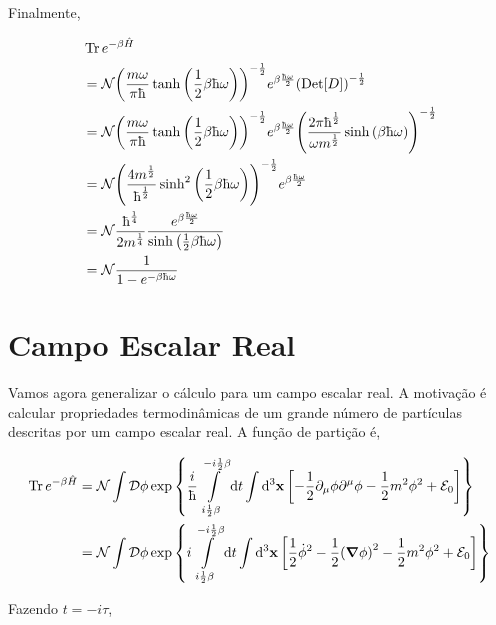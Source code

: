 \documentclass[twoside]{amsart}
\newcommand{\Dd}[1]{\mathcal D #1}
\newcommand{\Det}[1]{\textup{Det} #1}
\numberwithin{equation}{section}
\begin{document}
Finalmente,

\begin{align}
    &\Tr e^{-\beta\hat H}\\
    &=\mathcal N\qty(\frac{m\omega}{\pi\hbar}\tanh\qty(\frac12\beta\hbar\omega))^{-\frac12}e^{\beta\frac{\hbar \omega}{2}}\qty(\Det\qty[D])^{-\frac12}\\
    &=\mathcal N\qty(\frac{m\omega}{\pi\hbar}\tanh\qty(\frac12\beta\hbar\omega))^{-\frac12}e^{\beta\frac{\hbar \omega}{2}}\qty(\frac{2\pi\hbar^\frac12}{\omega m^\frac12}\sinh\qty(\beta\hbar\omega))^{-\frac12}\\
    &=\mathcal N\qty(\frac{4m^\frac12}{\hbar^\frac12}\sinh^2\qty(\frac12\beta\hbar\omega))^{-\frac12}e^{\beta\frac{\hbar \omega}{2}}\\
    &=\mathcal N\frac{\hbar^\frac14}{2m^\frac14}\frac{e^{\beta\frac{\hbar \omega}{2}}}{\sinh\qty(\frac12\beta\hbar\omega)}\\
    &=\mathcal N\frac{1}{1-e^{-\beta\hbar\omega}}
\end{align}



\section{Campo Escalar Real}

Vamos agora generalizar o cálculo para um campo escalar real. A motivação é calcular propriedades termodinâmicas de um grande número de partículas descritas por um campo escalar real. A função de partição é,

\begin{align}
    \Tr e^{-\beta\hat H}&=\mathcal N\int\Dd{\phi}\exp\qty{\frac i\hbar\int\limits_{i\frac12\beta}^{-i\frac12\beta}\dd{t}\int\dd[3]{\vb x}\qty[-\frac12\partial_\mu\phi\partial^\mu\phi-\frac12m^2\phi^2+\mathcal E_0]}\\
    &=\mathcal N\int\Dd{\phi}\exp\qty{i\int\limits_{i\frac12\beta}^{-i\frac12\beta}\dd{t}\int\dd[3]{\vb x}\qty[\frac{1}{2}{\dot\phi}^2-\frac12\qty(\grad\phi)^2-\frac12m^2\phi^2+\mathcal E_0]}
\end{align}

Fazendo $t=-i\tau$,
\end{document}
